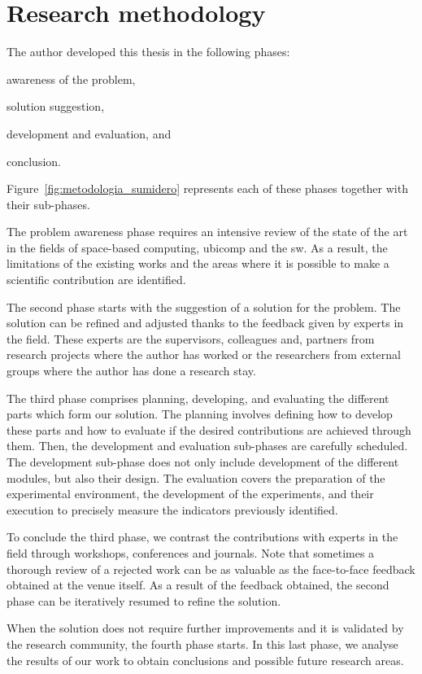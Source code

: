 \section{Research methodology}

The author developed this thesis in the following phases:
\begin{enumerate*}[label=\itshape(\arabic*\upshape)]
  \item awareness of the problem,
  \item solution suggestion,
  \item development and evaluation, and
  \item conclusion.
\end{enumerate*}
Figure~\ref{fig:metodologia_sumidero} represents each of these phases together with their sub-phases. %


The problem awareness phase requires an intensive review of the state of the art in the fields of space-based computing, \acl{ubicomp} and the \acl{sw}.
As a result, the limitations of the existing works and the areas where it is possible to make a scientific contribution are identified.


The second phase starts with the suggestion of a solution for the problem.
The solution can be refined and adjusted thanks to the feedback given by experts in the field.
These experts are the supervisors, colleagues and, partners from research projects where the author has worked or the researchers from external groups where the author has done a research stay. %


The third phase comprises planning, developing, and evaluating the different parts which form our solution.
The planning involves defining how to develop these parts and how to evaluate if the desired contributions are achieved through them.
Then, the development and evaluation sub-phases are carefully scheduled.
The development sub-phase does not only include development of the different modules, but also their design.
The evaluation covers the preparation of the experimental environment, the development of the experiments, and their execution to precisely measure the indicators previously identified. %


To conclude the third phase, we contrast the contributions with experts in the field through workshops, conferences and journals.
Note that sometimes a thorough review of a rejected work can be as valuable as the face-to-face feedback obtained at the venue itself. %
As a result of the feedback obtained, the second phase can be iteratively resumed to refine the solution.


When the solution does not require further improvements and it is validated by the research community, the fourth phase starts.
In this last phase, we analyse the results of our work to obtain conclusions and possible future research areas.

